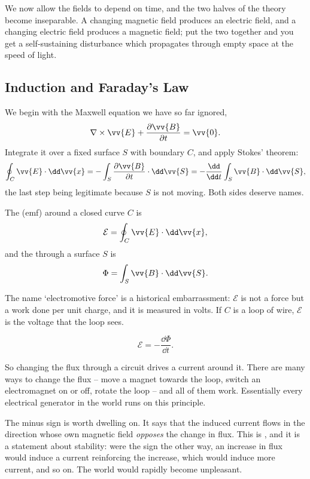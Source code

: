 We now allow the fields to depend on time, and the two halves of the theory become inseparable. A changing magnetic field produces an electric field, and a changing electric field produces a magnetic field; put the two together and you get a self-sustaining disturbance which propagates through empty space at the speed of light.

\subsection{Induction and Faraday's Law}

We begin with the Maxwell equation we have so far ignored,
$$
\nabla \times \vv{E} + \frac{\partial \vv{B}}{\partial t} = \vv{0}.
$$
Integrate it over a fixed surface $S$ with boundary $C$, and apply Stokes' theorem:
$$
\oint_C \vv{E}\cdot \dd \vv{x} = -\int_S \frac{\partial \vv{B}}{\partial t}\cdot \dd \vv{S} = -\frac{\dd}{\dd t}\int_S \vv{B}\cdot \dd \vv{S},
$$
the last step being legitimate because $S$ is not moving. Both sides deserve names.

\begin{definition}
	The  (emf) around a closed curve $C$ is
	$$
	\mathcal{E} = \oint_C \vv{E}\cdot \dd \vv{x},
	$$
	and the  through a surface $S$ is
	$$
	\Phi = \int_S \vv{B}\cdot \dd \vv{S}.
	$$
\end{definition}

The name `electromotive force' is a historical embarrassment: $\mathcal{E}$ is not a force but a work done per unit charge, and it is measured in volts. If $C$ is a loop of wire, $\mathcal{E}$ is the voltage that the loop sees.

\begin{law}
	$$
	\mathcal{E} = -\frac{\dd \Phi}{\dd t}.
	$$
\end{law}

So changing the flux through a circuit drives a current around it. There are many ways to change the flux -- move a magnet towards the loop, switch an electromagnet on or off, rotate the loop -- and all of them work. Essentially every electrical generator in the world runs on this principle.

The minus sign is worth dwelling on. It says that the induced current flows in the direction whose own magnetic field \emph{opposes} the change in flux. This is , and it is a statement about stability: were the sign the other way, an increase in flux would induce a current reinforcing the increase, which would induce more current, and so on. The world would rapidly become unpleasant.

